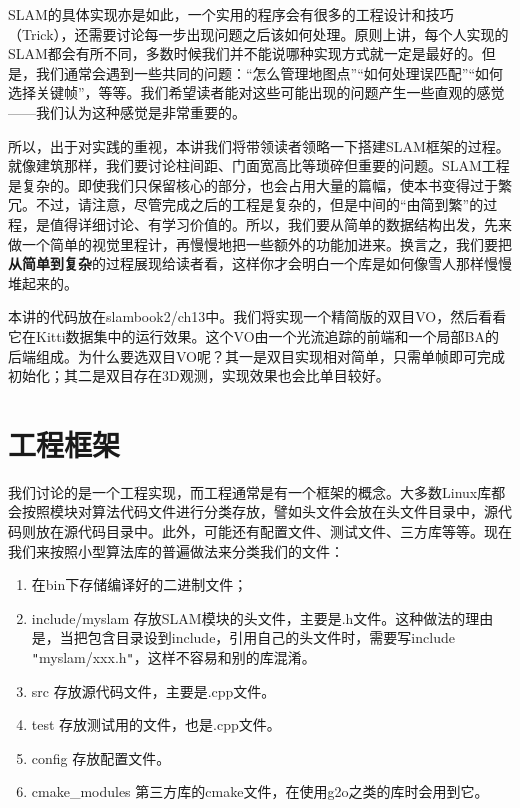 SLAM的具体实现亦是如此，一个实用的程序会有很多的工程设计和技巧（Trick），还需要讨论每一步出现问题之后该如何处理。原则上讲，每个人实现的SLAM都会有所不同，多数时候我们并不能说哪种实现方式就一定是最好的。但是，我们通常会遇到一些共同的问题：“怎么管理地图点”“如何处理误匹配”“如何选择关键帧”，等等。我们希望读者能对这些可能出现的问题产生一些直观的感觉——我们认为这种感觉是非常重要的。

\clearpage
所以，出于对实践的重视，本讲我们将带领读者领略一下搭建SLAM框架的过程。就像建筑那样，我们要讨论柱间距、门面宽高比等琐碎但重要的问题。SLAM工程是复杂的。即使我们只保留核心的部分，也会占用大量的篇幅，使本书变得过于繁冗。不过，请注意，尽管完成之后的工程是复杂的，但是中间的“由简到繁”的过程，是值得详细讨论、有学习价值的。所以，我们要从简单的数据结构出发，先来做一个简单的视觉里程计，再慢慢地把一些额外的功能加进来。换言之，我们要把\textbf{从简单到复杂}的过程展现给读者看，这样你才会明白一个库是如何像雪人那样慢慢堆起来的。

本讲的代码放在slambook2/ch13中。我们将实现一个精简版的双目VO，然后看看它在Kitti数据集中的运行效果。这个VO由一个光流追踪的前端和一个局部BA的后端组成。为什么要选双目VO呢？其一是双目实现相对简单，只需单帧即可完成初始化；其二是双目存在3D观测，实现效果也会比单目较好。

\section{工程框架}
我们讨论的是一个工程实现，而工程通常是有一个框架的概念。大多数Linux库都会按照模块对算法代码文件进行分类存放，譬如头文件会放在头文件目录中，源代码则放在源代码目录中。此外，可能还有配置文件、测试文件、三方库等等。现在我们来按照小型算法库的普遍做法来分类我们的文件：

\begin{enumerate}
    \item 在bin下存储编译好的二进制文件；
	\item include/myslam	存放SLAM模块的头文件，主要是.h文件。这种做法的理由是，当把包含目录设到include，引用自己的头文件时，需要写include \texttt{"}myslam/xxx.h\texttt{"}，这样不容易和别的库混淆。
	\item src	存放源代码文件，主要是.cpp文件。
	\item test	存放测试用的文件，也是.cpp文件。
	\item config	存放配置文件。
	\item cmake\_modules	第三方库的cmake文件，在使用g2o之类的库时会用到它。
\end{enumerate}

